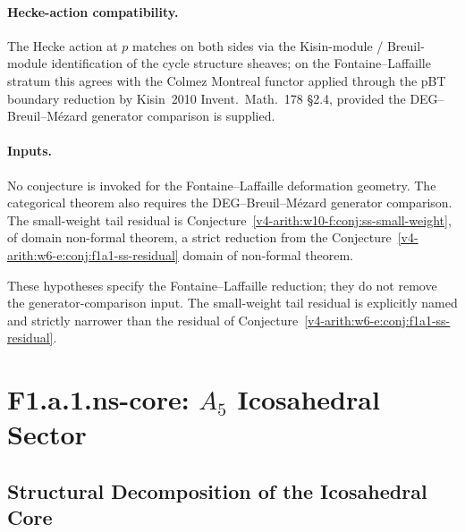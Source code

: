 \paragraph{Hecke-action compatibility.} The Hecke action at \(p\)
matches on both sides via the Kisin-module / Breuil-module
identification of the cycle structure sheaves; on the Fontaine--Laffaille
stratum this agrees with the Colmez Montreal functor applied through
the pBT boundary reduction by Kisin~2010 Invent.~Math.~178 \S 2.4,
provided the DEG--Breuil--M{\'e}zard generator comparison is supplied.

\paragraph{Inputs.} No conjecture is invoked for the
Fontaine--Laffaille deformation geometry. The categorical theorem also
requires the DEG--Breuil--M{\'e}zard generator comparison. The
small-weight tail residual is Conjecture~\ref{v4-arith:w10-f:conj:ss-small-weight}, of domain
non-formal theorem, a strict reduction from the
Conjecture~\ref{v4-arith:w6-e:conj:f1a1-ss-residual} domain of non-formal theorem.



These hypotheses specify the Fontaine--Laffaille reduction; they do not
remove the generator-comparison input. The small-weight tail residual
is explicitly named and strictly narrower than the residual of
Conjecture~\ref{v4-arith:w6-e:conj:f1a1-ss-residual}.

\section{F1.a.1.ns-core: \(A_{5}\) Icosahedral Sector}
\label{v4-arith:w10-f:ns-core}

\subsection{Structural Decomposition of the Icosahedral Core}
\label{v4-arith:w10-f:ns-decomposition}

